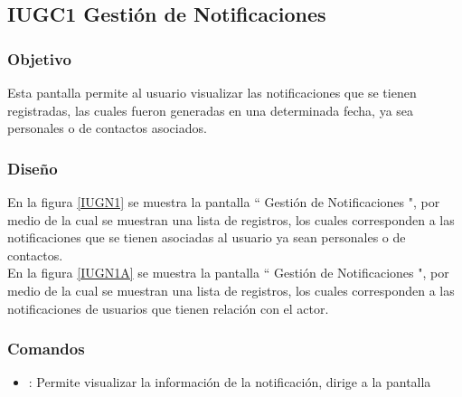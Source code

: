 \subsection{IUGC1 Gestión de Notificaciones}

\subsubsection{Objetivo}

	
    Esta pantalla permite al usuario visualizar  las notificaciones que se tienen registradas, las cuales fueron generadas en una determinada fecha, ya sea personales o de contactos asociados.

\subsubsection{Diseño}


    En la figura \ref{IUGN1} se muestra la pantalla `` Gestión de Notificaciones ", por medio de la cual se muestran una lista de registros, los cuales corresponden a las notificaciones que se tienen asociadas al usuario ya sean personales o de contactos.\\
    En la figura \ref{IUGN1A} se muestra la pantalla `` Gestión de Notificaciones ", por medio de la cual se muestran una lista de registros, los cuales corresponden a las notificaciones de usuarios que tienen relación con el actor.\\

\subsubsection{Comandos}
    \begin{itemize}
    	\item \btnDetalle[Detalle]: Permite visualizar la información de la notificación, dirige a la pantalla 
    \end{itemize}

